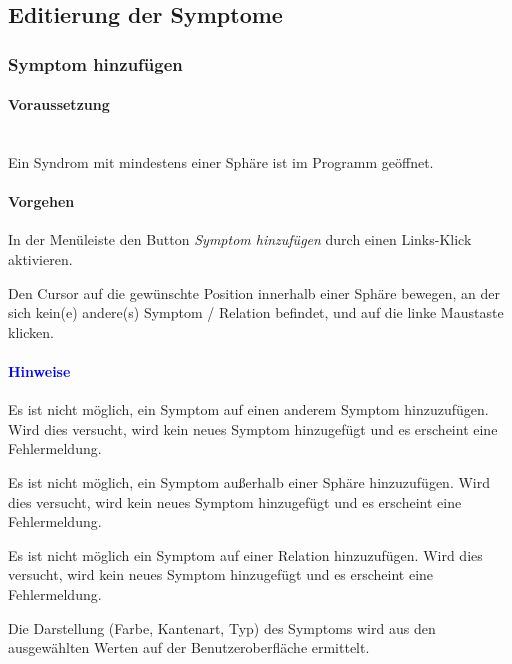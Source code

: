 \documentclass[enabledeprecatedfontcommands,fontsize=11pt,paper=a4,twoside]{scrartcl}
\newcounter{one}
\newcounter{two}[one]
\newcommand*{\hint}{\paragraph{\textcolor{blue}{Hinweise}}}
\newcommand*{\condition}{\paragraph{Voraussetzung}$\;$ \vspace{0.2cm}\\}
\newcommand*{\action}{\paragraph{Vorgehen}}
\let\tempone\itemize
\let\temptwo\enditemize
\renewenvironment{itemize}{\tempone\addtolength{\itemsep}{-10.0pt}}{\temptwo}
\let\origenumerate\enumerate
\let\origendenumerate\endenumerate
\renewenvironment{enumerate}{\origenumerate \addtolength{\itemsep}{-10.0pt}}{\origendenumerate}
\begin{document}
				
\subsection{Editierung der Symptome} \label{symptom}
		\subsubsection{Symptom hinzufügen}
		\condition 	
		Ein Syndrom mit mindestens einer Sphäre ist im Programm geöffnet. 
		\action
		\begin{enumerate}
			\item In der Menüleiste den Button \textit{Symptom hinzufügen} durch einen Links-Klick aktivieren.
			\item Den Cursor auf die gewünschte Position innerhalb einer Sphäre bewegen, an der sich kein(e) andere(s) Symptom / Relation befindet, und auf die linke Maustaste klicken.
		\end{enumerate}
		\hint
		\begin{itemize}
			\item Es ist nicht möglich, ein Symptom auf einen anderem Symptom hinzuzufügen. Wird dies versucht, wird kein neues Symptom hinzugefügt und es erscheint eine Fehlermeldung.
			\item Es ist nicht möglich, ein Symptom außerhalb einer Sphäre hinzuzufügen. Wird dies versucht, wird kein neues Symptom hinzugefügt und es erscheint eine Fehlermeldung.
			\item Es ist nicht möglich ein Symptom auf einer Relation hinzuzufügen. Wird dies versucht, wird kein neues Symptom hinzugefügt und es erscheint eine Fehlermeldung.
			\item Die Darstellung (Farbe, Kantenart, Typ) des Symptoms wird aus den ausgewählten Werten auf der Benutzeroberfläche ermittelt. \\
		\end{itemize}

\end{document}
